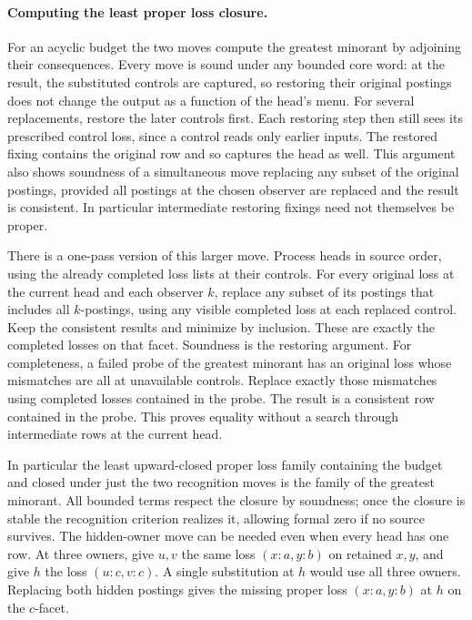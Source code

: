 \paragraph{Computing the least proper loss closure.}
For an acyclic budget the two moves compute the
greatest minorant by adjoining their consequences.
Every move is sound under any bounded core word:
at the result, the substituted controls are
captured, so restoring their original postings
does not change the output as a function of the
head's menu. For several replacements, restore
the later controls first. Each restoring step
then still sees its prescribed control loss,
since a control reads only earlier inputs.
The restored fixing contains the original row
and so captures the head as well. This argument
also shows soundness of a simultaneous move
replacing any subset of the original postings,
provided all postings at the chosen observer
are replaced and the result is consistent.
In particular intermediate restoring fixings
need not themselves be proper.

There is a one-pass version of this larger
move. Process heads in source order, using the
already completed loss lists at their controls.
For every original loss at the current head
and each observer $k$, replace any subset of
its postings that includes all $k$-postings,
using any visible completed loss at each
replaced control. Keep the consistent results
and minimize by inclusion. These are exactly
the completed losses on that facet. Soundness
is the restoring argument. For completeness,
a failed probe of the greatest minorant has
an original loss whose mismatches are all at
unavailable controls. Replace exactly those
mismatches using completed losses contained
in the probe. The result is a consistent row
contained in the probe. This proves equality
without a search through intermediate rows
at the current head.

In particular the least upward-closed proper
loss family containing the budget and closed
under just the two recognition moves is the
family of the greatest minorant. All bounded
terms respect the closure by soundness; once
the closure is stable the recognition criterion
realizes it, allowing formal zero if no source
survives. The hidden-owner move can be needed
even when every head has one row. At three
owners, give $u,v$ the same loss $(x{:}a,y{:}b)$
on retained $x,y$, and give $h$ the loss
$(u{:}c,v{:}c)$. A single substitution at $h$
would use all three owners. Replacing both
hidden postings gives the missing proper loss
$(x{:}a,y{:}b)$ at $h$ on the $c$-facet.

